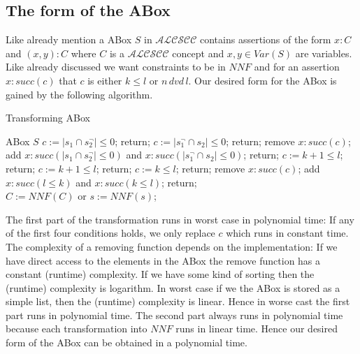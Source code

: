 \documentclass[a4paper,11pt]{scrartcl}
\theoremstyle{break}
\theoremstyle{definition}
\begin{document}
\subsection{The form of the ABox}
Like already mention a ABox $S$ in $\mathcal{ALCSCC}$ contains assertions of the form $x:C$ and $(x,y):C$ where $C$ is a $\mathcal{ALCSCC}$ concept and $x,y\in Var(S)$ are variables. Like already discussed we want constraints to be in $NNF$ and for an assertion $x:succ(c)$ that $c$ is either $k\leq l$ or $n\,dvd\,l$.
Our desired form for the ABox is gained by the following algorithm.
\begin{algorithm}[H] \caption{Transforming ABox}
\begin{algorithmic}[l]
\State ABox $S$
\State $c:=|s_1\cap s_2^\neg|\leq 0$; return;
\EndIf
{}
\State $c:=|s_1^\neg\cap s_2|\leq 0$; return;
\EndIf
{}
\State remove $x:succ(c)$;
\State add $x:succ(|s_1\cap s_2^\neg|\leq 0)$ and $x:succ(|s_1^\neg\cap s_2|\leq 0)$; return;
\EndIf
{}
\State $c:=k +1\leq l$; return;
\EndIf
{}
\State $c:=k +1\leq l$; return;
\EndIf
{}
\State $c:=k\leq l$; return;
\EndIf
{}
\State remove $x:succ(c)$;
\State add $x:succ(l\leq k)$ and $x:succ(k\leq l)$; return;
\EndIf
\EndFor\\
\State $C:=NNF(C)$ or $s:=NNF(s)$;
\EndFor
\end{algorithmic}
\end{algorithm}
The first part of the transformation runs in worst case in polynomial time: If any of the first four conditions holds, we only replace $c$ which runs in constant time.  The complexity of a removing function depends on the implementation: If we have direct access to the elements in the ABox the remove function has a constant (runtime) complexity. If we have some kind of sorting then the (runtime) complexity is logarithm. In worst case if we the ABox is stored as a simple list, then the (runtime) complexity is linear. Hence in worse cast the first part runs in polynomial time. The second part always runs in polynomial time because each transformation into $NNF$ runs in linear time. Hence our desired form of the ABox can be obtained in a polynomial time.
\fi
\end{document}
